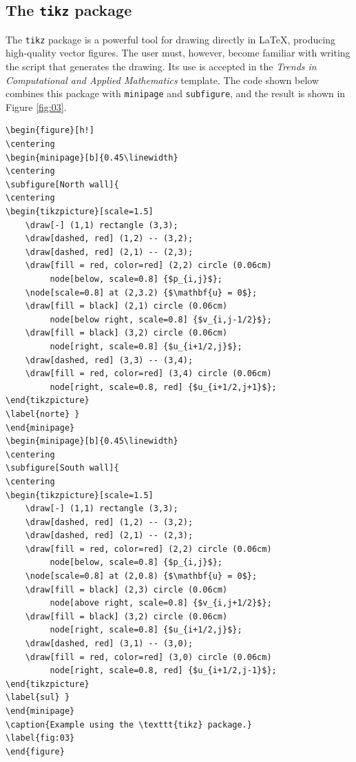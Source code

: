 \documentclass[english]{TCAM} %
\begin{document}
\subsection{The \texttt{tikz} package}

The \texttt{tikz} package is a powerful tool for drawing directly in \LaTeX, producing high-quality vector figures. The user must, however, become familiar with writing the script that generates the drawing. Its use is accepted in the \textit{Trends in Computational and Applied Mathematics} template. The code shown below combines this package with \texttt{minipage} and \texttt{subfigure}, and the result is shown in Figure \ref{fig:03}.

\newpage

\begin{framed}
\begin{lstlisting}[language={[latex]TeX}]
\begin{figure}[h!]
\centering
\begin{minipage}[b]{0.45\linewidth}
\centering
\subfigure[North wall]{
\centering
\begin{tikzpicture}[scale=1.5]
    \draw[-] (1,1) rectangle (3,3);
    \draw[dashed, red] (1,2) -- (3,2);
    \draw[dashed, red] (2,1) -- (2,3);
    \draw[fill = red, color=red] (2,2) circle (0.06cm)
         node[below, scale=0.8] {$p_{i,j}$};
    \node[scale=0.8] at (2,3.2) {$\mathbf{u} = 0$};
    \draw[fill = black] (2,1) circle (0.06cm)
         node[below right, scale=0.8] {$v_{i,j-1/2}$};
    \draw[fill = black] (3,2) circle (0.06cm)
         node[right, scale=0.8] {$u_{i+1/2,j}$};
    \draw[dashed, red] (3,3) -- (3,4);
    \draw[fill = red, color=red] (3,4) circle (0.06cm)
         node[right, scale=0.8, red] {$u_{i+1/2,j+1}$};
\end{tikzpicture}
\label{norte} }
\end{minipage}
\begin{minipage}[b]{0.45\linewidth}
\centering
\subfigure[South wall]{
\centering
\begin{tikzpicture}[scale=1.5]
    \draw[-] (1,1) rectangle (3,3);
    \draw[dashed, red] (1,2) -- (3,2);
    \draw[dashed, red] (2,1) -- (2,3);
    \draw[fill = red, color=red] (2,2) circle (0.06cm)
         node[below, scale=0.8] {$p_{i,j}$};
    \node[scale=0.8] at (2,0.8) {$\mathbf{u} = 0$};
    \draw[fill = black] (2,3) circle (0.06cm)
         node[above right, scale=0.8] {$v_{i,j+1/2}$};
    \draw[fill = black] (3,2) circle (0.06cm)
         node[right, scale=0.8] {$u_{i+1/2,j}$};
    \draw[dashed, red] (3,1) -- (3,0);
    \draw[fill = red, color=red] (3,0) circle (0.06cm)
         node[right, scale=0.8, red] {$u_{i+1/2,j-1}$};
\end{tikzpicture}
\label{sul} }
\end{minipage}
\caption{Example using the \texttt{tikz} package.}
\label{fig:03}
\end{figure}
\end{lstlisting}
\end{framed}
\end{document}
